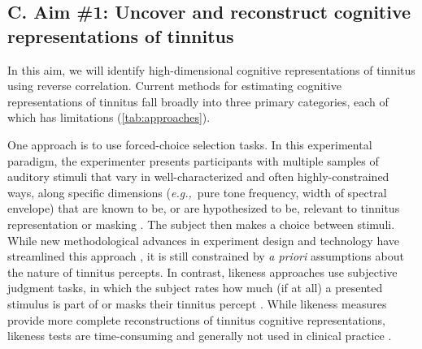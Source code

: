 \documentclass[11pt, notitlepage]{article} %
\def\eg{{\emph{e.g.,}}~}
\begin{document}

\subsection*{C. Aim \#1: Uncover and reconstruct cognitive representations of tinnitus}

In this aim, we will identify high-dimensional cognitive representations of tinnitus using reverse correlation.
Current methods for estimating cognitive representations of tinnitus fall broadly into three primary categories,
each of which has limitations (\autoref{tab:approaches}).

One approach is to use forced-choice selection tasks.
In this experimental paradigm,
the experimenter presents participants with multiple samples of auditory stimuli that vary in well-characterized
and often highly-constrained ways, along specific dimensions (\eg pure tone frequency, width of spectral envelope)
that are known to be, or are hypothesized to be, relevant to tinnitus representation or masking
\cite{vajsakovicPrinciplesMethodsPsychoacoustic2021,henryMeasurementTinnitus2016}.
The subject then makes a choice between stimuli.
While new methodological advances in experiment design and technology have streamlined this approach
\cite{korthOneStepCloser2020,henryComputerautomatedTinnitusAssessment2004,henryComputerautomatedTinnitusAssessment2013},
it is still constrained by \emph{a priori} assumptions about the nature of tinnitus percepts.
In contrast, likeness approaches use subjective judgment tasks,
in which the subject rates how much (if at all) a presented stimulus is part of or masks their tinnitus percept
\cite{norenaPsychoacousticCharacterizationTinnitus2002}.
While likeness measures provide more complete reconstructions of tinnitus cognitive representations,
likeness tests are time-consuming and generally not used in clinical practice
\cite{vajsakovicPrinciplesMethodsPsychoacoustic2021}.
\end{document}
